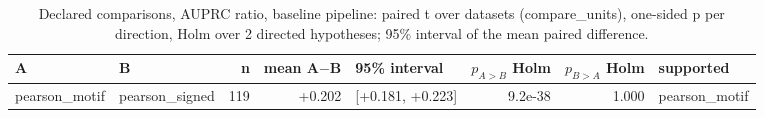\begin{table}[H]\centering\small
\caption{Declared comparisons, AUPRC ratio, baseline pipeline: paired t over datasets (compare\_units), one-sided p per direction, Holm over 2 directed hypotheses; 95\% interval of the mean paired difference.}
\begin{tabular}{llrrlrrl}\toprule
A & B & n & mean A$-$B & 95\% interval & $p_{A>B}$ Holm & $p_{B>A}$ Holm & supported \\ \midrule
pearson\_motif & pearson\_signed & 119 & +0.202 & [+0.181, +0.223] & 9.2e-38 & 1.000 & pearson\_motif \\
\bottomrule\end{tabular}\end{table}
